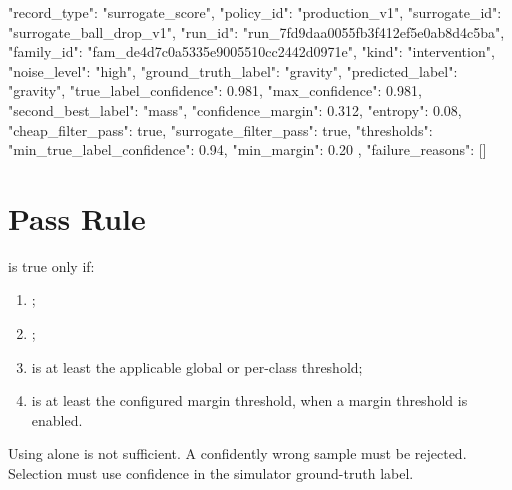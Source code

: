 \documentclass[11pt]{article}
\begin{document}
\begin{DocCode}
{
  "record_type": "surrogate_score",
  "policy_id": "production_v1",
  "surrogate_id": "surrogate_ball_drop_v1",
  "run_id": "run_7fd9daa0055fb3f412ef5e0ab8d4c5ba",
  "family_id": "fam_de4d7c0a5335e9005510cc2442d0971e",
  "kind": "intervention",
  "noise_level": "high",
  "ground_truth_label": "gravity",
  "predicted_label": "gravity",
  "true_label_confidence": 0.981,
  "max_confidence": 0.981,
  "second_best_label": "mass",
  "confidence_margin": 0.312,
  "entropy": 0.08,
  "cheap_filter_pass": true,
  "surrogate_filter_pass": true,
  "thresholds": {
    "min_true_label_confidence": 0.94,
    "min_margin": 0.20
  },
  "failure_reasons": []
}
\end{DocCode}

\section*{Pass Rule}

 is true only if:

\begin{enumerate}
\item {};
\item {};
\item {} is at least the applicable global or per-class threshold;
\item {} is at least the configured margin threshold, when a margin threshold is enabled.
\end{enumerate}

Using  alone is not sufficient.
A confidently wrong sample must be rejected.
Selection must use confidence in the simulator ground-truth label.
\end{document}
